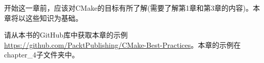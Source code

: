 开始这一章前，应该对CMake的目标有所了解(需要了解第1章和第3章的内容)。本章将以这些知识为基础。

请从本书的GitHub库中获取本章的示例\url{https://github.com/PacktPublishing/CMake-Best-Practices}。本章的示例在chapter\_4子文件夹中。